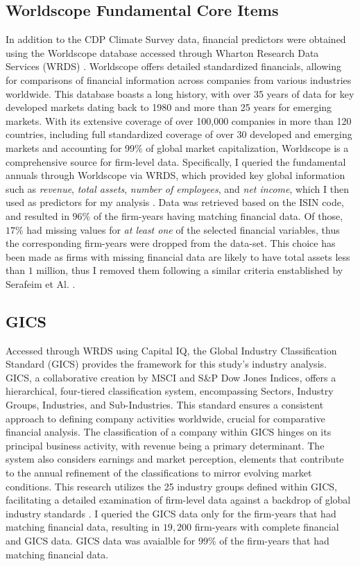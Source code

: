 \subsection{Worldscope Fundamental Core Items}
In addition to the CDP Climate Survey data, financial predictors were obtained using the Worldscope database \cite{Worldscope_2} accessed through Wharton Research Data Services (WRDS) \cite{WRDS}. Worldscope offers detailed standardized financials, allowing for comparisons of financial information across companies from various industries worldwide. This database boasts a long history, with over 35 years of data for key developed markets dating back to 1980 and more than 25 years for emerging markets. With its extensive coverage of over 100,000 companies in more than 120 countries, including full standardized coverage of over 30 developed and emerging markets and accounting for 99\% of global market capitalization, Worldscope is a comprehensive source for firm-level data. Specifically, I queried the fundamental annuals through Worldscope via WRDS, which provided key global information such as \textit{revenue}, \textit{total assets}, \textit{number of employees}, and \textit{net income}, which I then used as predictors for my analysis \cite{Worldscope_2}. Data was retrieved based on the ISIN code, and resulted in $96\%$ of the firm-years having matching financial data. Of those, $17\%$ had missing values for \textit{at least one} of the selected financial variables, thus the corresponding firm-years were dropped from the data-set. This choice has been made as firms with missing financial data are likely to have total assets less than $1$ million, thus I removed them following a similar criteria enstablished by Serafeim et Al. \cite{incentive-diffusion}.

 \subsection{GICS}
 Accessed through WRDS using Capital IQ, the Global Industry Classification Standard (GICS) provides the framework for this study's industry analysis. GICS, a collaborative creation by MSCI and S\&P Dow Jones Indices, offers a hierarchical, four-tiered classification system, encompassing Sectors, Industry Groups, Industries, and Sub-Industries. This standard ensures a consistent approach to defining company activities worldwide, crucial for comparative financial analysis. The classification of a company within GICS hinges on its principal business activity, with revenue being a primary determinant. The system also considers earnings and market perception, elements that contribute to the annual refinement of the classifications to mirror evolving market conditions. This research utilizes the 25 industry groups defined within GICS, facilitating a detailed examination of firm-level data against a backdrop of global industry standards \cite{GICS_MSCI, GICS_Wikipedia}. I queried the GICS data only for the firm-years that had matching financial data, resulting in $19,200$ firm-years with complete financial and GICS data. GICS data was avaialble for $99\%$ of the firm-years that had matching financial data.
 
